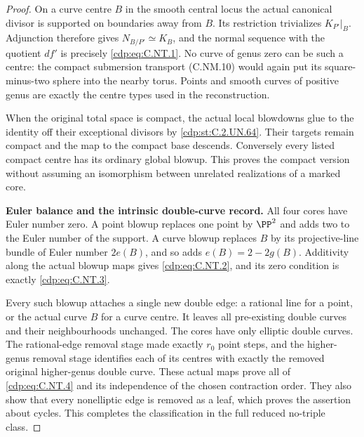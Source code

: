 \begin{proof}
On a curve centre $B$ in the smooth central
locus the actual canonical divisor is supported
on boundaries away from $B$. Its restriction
trivializes $K_{P'}|_B$. Adjunction therefore gives
$N_{B/P'}\simeq K_B$, and the normal sequence
with the quotient $df'$ is precisely \eqref{cdp:eq:C.NT.1}.
No curve of genus zero can be such a centre:
the compact submersion transport (C.NM.10)
would again put its square-minus-two sphere
into the nearby torus. Points and smooth curves
of positive genus are exactly the centre
types used in the reconstruction.

When the original total space is compact, the
actual local blowdowns glue to the identity
off their exceptional divisors by \ref{cdp:st:C.2.UN.64}.
Their targets remain compact and the map to
the compact base descends. Conversely every
listed compact centre has its ordinary global
blowup. This proves the compact version without
assuming an isomorphism between unrelated
realizations of a marked core.

\par\medskip\noindent\textbf{Euler balance and the intrinsic double-curve record.}
All four cores have Euler number zero. A point
blowup replaces one point by $\PP^2$ and adds two
to the Euler number of the support. A curve
blowup replaces $B$ by its projective-line bundle
of Euler number $2e(B)$, and so adds
$e(B)=2-2g(B)$. Additivity along the actual
blowup maps gives \eqref{cdp:eq:C.NT.2}, and its zero
condition is exactly \eqref{cdp:eq:C.NT.3}.

Every such blowup attaches a single new double
edge: a rational line for a point, or the actual
curve $B$ for a curve centre. It leaves all
pre-existing double curves and their
neighbourhoods unchanged. The cores have only
elliptic double curves. The rational-edge
removal stage made exactly $r_0$ point steps,
and the higher-genus removal stage identifies
each of its centres with exactly the removed
original higher-genus double curve. These
actual maps prove all of \eqref{cdp:eq:C.NT.4} and its
independence of the chosen contraction order.
They also show that every nonelliptic edge
is removed as a leaf, which proves the
assertion about cycles. This completes the
classification in the full reduced
no-triple class.
\end{proof}


